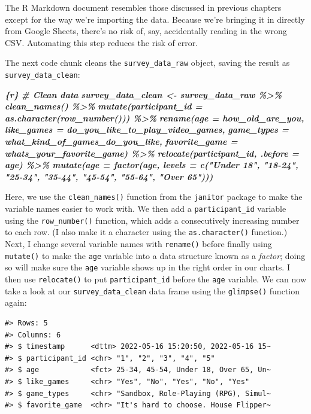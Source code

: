 \documentclass[
]{book}
\newenvironment{Shaded}{\begin{snugshade}}{\end{snugshade}}
\newcommand{\InformationTok}[1]{\textcolor[rgb]{0.56,0.35,0.01}{\textbf{\textit{#1}}}}
\begin{document}
The R Markdown document resembles those discussed in previous chapters except for the way we're importing the data. Because we're bringing it in directly from Google Sheets, there's no risk of, say, accidentally reading in the wrong CSV. Automating this step reduces the risk of error.

The next code chunk cleans the \texttt{survey\_data\_raw} object, saving the result as \texttt{survey\_data\_clean}:

\begin{Shaded}
\begin{Highlighting}[]
\InformationTok{\textasciigrave{}\textasciigrave{}\textasciigrave{}\{r\}}
\InformationTok{\# Clean data}
\InformationTok{survey\_data\_clean \textless{}{-} survey\_data\_raw \%\textgreater{}\%}
\InformationTok{  clean\_names() \%\textgreater{}\%}
\InformationTok{  mutate(participant\_id = as.character(row\_number())) \%\textgreater{}\%}
\InformationTok{  rename(age = how\_old\_are\_you,}
\InformationTok{         like\_games = do\_you\_like\_to\_play\_video\_games,}
\InformationTok{         game\_types = what\_kind\_of\_games\_do\_you\_like,}
\InformationTok{         favorite\_game = whats\_your\_favorite\_game) \%\textgreater{}\%}
\InformationTok{  relocate(participant\_id, .before = age) \%\textgreater{}\%}
\InformationTok{  mutate(age = factor(age, levels = c("Under 18", "18{-}24", "25{-}34", "35{-}44", "45{-}54", "55{-}64", "Over 65")))}
\InformationTok{\textasciigrave{}\textasciigrave{}\textasciigrave{}}
\end{Highlighting}
\end{Shaded}

Here, we use the \texttt{clean\_names()} function from the \texttt{janitor} package to make the variable names easier to work with. We then add a \texttt{participant\_id} variable using the \texttt{row\_number()} function, which adds a consecutively increasing number to each row. (I also make it a character using the \texttt{as.character()} function.) Next, I change several variable names with \texttt{rename()} before finally using \texttt{mutate()} to make the \texttt{age} variable into a data structure known as a \emph{factor}; doing so will make sure the \texttt{age} variable shows up in the right order in our charts. I then use \texttt{relocate()} to put \texttt{participant\_id} before the \texttt{age} variable. We can now take a look at our \texttt{survey\_data\_clean} data frame using the \texttt{glimpse()} function again:

\begin{verbatim}
#> Rows: 5
#> Columns: 6
#> $ timestamp      <dttm> 2022-05-16 15:20:50, 2022-05-16 15~
#> $ participant_id <chr> "1", "2", "3", "4", "5"
#> $ age            <fct> 25-34, 45-54, Under 18, Over 65, Un~
#> $ like_games     <chr> "Yes", "No", "Yes", "No", "Yes"
#> $ game_types     <chr> "Sandbox, Role-Playing (RPG), Simul~
#> $ favorite_game  <chr> "It's hard to choose. House Flipper~
\end{verbatim}
\end{document}
